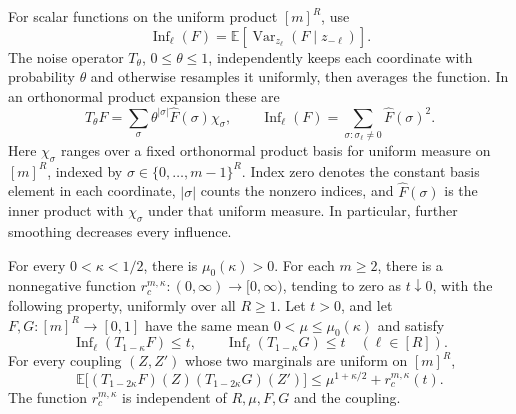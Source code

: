 For scalar functions on the uniform product \([m]^R\), use
\[
 \operatorname{Inf}_\ell(F)
 =\mathbb E\!\left[\operatorname{Var}_{z_\ell}
       (F\mid z_{-\ell})\right].
\]
The noise operator \(T_\theta\), \(0\le\theta\le1\), independently
keeps each coordinate with probability \(\theta\) and otherwise
resamples it uniformly, then averages the function.  In an orthonormal
product expansion these are
\begin{equation}
 T_\theta F=\sum_\sigma\theta^{|\sigma|}\widehat F(\sigma)\chi_\sigma,
 \qquad
 \operatorname{Inf}_\ell(F)
 =\sum_{\sigma:\sigma_\ell\ne0}\widehat F(\sigma)^2.
\label{eq:ordering-noise-influence}
\end{equation}
Here $\chi_\sigma$ ranges over a fixed orthonormal product basis for
uniform measure on $[m]^R$, indexed by $\sigma\in\{0,\ldots,m-1\}^R$.
Index zero denotes the constant basis element in each coordinate,
$|\sigma|$ counts the nonzero indices, and $\widehat F(\sigma)$ is the
inner product with $\chi_\sigma$ under that uniform measure.
In particular, further smoothing decreases every influence.

\begin{lemma}\label{lem:ordering-collision}
For every \(0<\kappa<1/2\), there is \(\mu_0(\kappa)>0\).  For
each \(m\ge2\), there is a nonnegative function
\(r_c^{m,\kappa}:(0,\infty)\to[0,\infty)\), tending to zero
as \(t\downarrow0\), with the following
property, uniformly over all \(R\ge1\).  Let \(t>0\), and let
\(F,G:[m]^R\to[0,1]\) have the same mean
\(0<\mu\le\mu_0(\kappa)\) and satisfy
\[
 \operatorname{Inf}_\ell(T_{1-\kappa}F)\le t,\qquad
 \operatorname{Inf}_\ell(T_{1-\kappa}G)\le t
 \quad(\ell\in[R]).
\]
For every coupling \((Z,Z')\) whose two marginals are uniform on
\([m]^R\),
\begin{equation}
 \mathbb E\bigl[
   (T_{1-2\kappa}F)(Z)(T_{1-2\kappa}G)(Z')\bigr]
 \le \mu^{1+\kappa/2}+r_c^{m,\kappa}(t).
\label{eq:ordering-collision}
\end{equation}
The function \(r_c^{m,\kappa}\) is independent of \(R,\mu,F,G\)
and the coupling.
\end{lemma}

